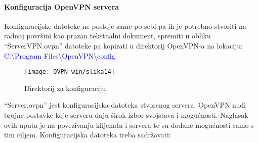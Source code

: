\paragraph*{Konfiguracija OpenVPN servera}
\hfill \bigbreak
Konfiguracijske datoteke ne postoje same po sebi pa ih je potrebno stvoriti na radnoj površini kao prazan tekstualni dokument, spremiti u obliku ``ServerVPN.ovpn'' datoteke pa kopirati u direktorij OpenVPN-a na lokaciju:\smallbreak
\textcolor{blue}{C:\textbackslash Program Files\textbackslash OpenVPN\textbackslash config}
\smallbreak
\begin{figure}[h!]
	\centering
     \texttt{[image: OVPN-win/slika14]}
     \caption{Direktorij za konfiguraciju}
\end{figure}
\FloatBarrier
``Server.ovpn'' jest konfiguracijska datoteka stvorenog servera. OpenVPN nudi brojne postavke koje serveru daju širok izbor svojstava i mogućnosti. Naglasak ovih uputa je na povezivanju klijenata i servera te su dodane mogućnosti samo s tim ciljem.\smallbreak
Konfiguracijska datoteka treba sadržavati:\smallbreak
